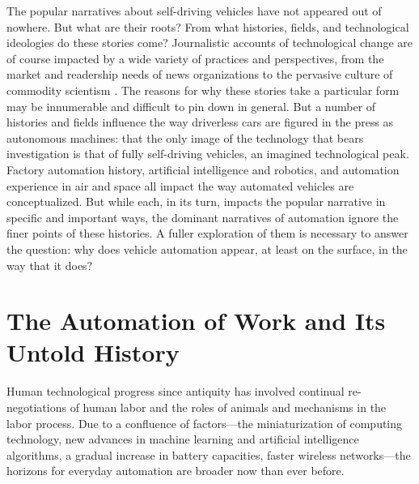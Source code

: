 The popular narratives about self-driving vehicles have not appeared
out of nowhere. But what are their roots? From what histories, fields,
and technological ideologies do these stories come? Journalistic
accounts of technological change are of 
course impacted by a wide variety of practices and perspectives, from
the market and readership needs of news organizations to the pervasive
culture of commodity scientism \cite{smithSelling}. The
reasons for why these stories take a particular form may be innumerable
and difficult to pin down in general. But a number of histories and
fields influence the way driverless cars are figured in the press as
autonomous machines: that the only image of the technology that bears
investigation is that of fully self-driving vehicles, an imagined
technological peak. Factory automation history,
artificial intelligence and robotics, and automation experience in
air and space all impact the way automated vehicles are
conceptualized. But while each,
in its turn, impacts the popular narrative in specific and important
ways, the dominant narratives of automation ignore the finer
points of these histories. A fuller exploration of them is necessary to
answer the question:  why does vehicle
automation appear, at least on the surface, in the way that it does?




\section{The Automation of Work and Its Untold History}

Human technological progress since antiquity has
involved continual re-negotiations of human labor and the roles of
animals and mechanisms in the labor process. Due to a confluence
of factors---the miniaturization of computing technology, new
advances in machine learning and artificial intelligence algorithms, a
gradual increase in battery capacities, faster wireless networks---the
horizons for everyday automation are broader now than ever before. 

